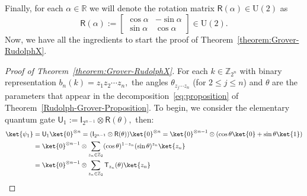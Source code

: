\documentclass[a4paper,11pt]{article}
\newcommand{\rI}{\mathsf{I}}
\newcommand{\rR}{\mathsf{R}}
\newcommand{\rU}{\mathsf{U}}
\newcommand{\rT}{\mathsf{T}}
\begin{document}
\bigskip

  Finally, for each $\alpha \in \mathbb{R}$ we will denote the rotation matrix  $\rR(\alpha) \in \mathrm{U}(2)$ as
$$
\rR(\alpha) := \begin{bmatrix}
\cos \alpha  & -\sin \alpha \\
\sin \alpha & \cos \alpha
\end{bmatrix} \in \mathrm{U}(2).
$$
Now, we have all the ingredients to start the proof of Theorem~\ref{theorem:Grover-RudolphX}. 


\begin{proof}[Proof of Theorem~\ref{theorem:Grover-RudolphX}]
For each \(k \in \mathbb{Z}_{2^n}\) with binary representation 
\(
b_n(k) = z_1 z_2 \cdots z_n,
\)
the angles \(\theta_{z_j \cdots z_n}\) (for \(2 \le j \le n\)) and \(\theta\) are the parameters that appear in the decomposition~\eqref{eq:proposition} of Theorem~\ref{Rudolph-Grover-Proposition}.
To begin, we consider the elementary quantum gate
$\rU_1:=\rI_{2^{n-1}}\otimes \rR(\theta),$ 
then:
  \begin{align*}
    \ket{\psi_1} &= \rU_1 \ket{0}^{\otimes n} = ( \rI_{2^{n-1}}\otimes \rR(\theta))\ket{0}^{\otimes n} = \ket{0}^{\otimes n-1} \otimes (\cos \theta \ket{0} + \sin \theta \ket{1}) \\
    &= \ket{0}^{\otimes n-1} \otimes \displaystyle \sum_{z_n\in \mathbb{Z}_2} (\cos \theta)^{1-z_n}(\sin \theta )^{z_n}\ket{z_n} \\ 
    & = \ket{0}^{\otimes n-1} \otimes \displaystyle \sum_{z_n\in \mathbb{Z}_2} \rT_{z_n}(\theta)\ket{z_n}
 \end{align*}



\end{proof}
\end{document}

